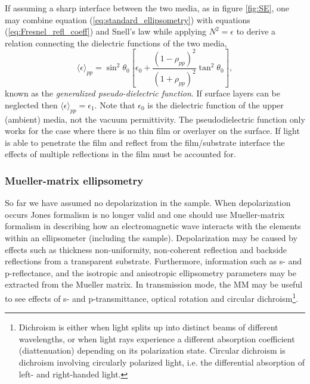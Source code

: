 If assuming a sharp interface between the two media, as in figure \ref{fig:SE}, one may combine equation (\ref{eq:standard_ellipsometry}) with equations (\ref{eq:Fresnel_refl_coeff}) and Snell's law while applying $N^2=\epsilon$ to derive a relation connecting the dielectric functions of the two media,
\begin{equation}
    \langle\epsilon\rangle_{pp} =  \sin^2\theta_0\left[ \epsilon_0 + \frac{(1-\rho_{pp})^2}{(1+\rho_{pp})^2}\tan^2\theta_0 \right],
    \label{eq:generalized_pseudo_dielectricfunction}
\end{equation}
known as the \emph{generalized pseudo-dielectric function}\cite{hans_arwin_reviewarticle}. If surface layers can be neglected then $\langle\epsilon\rangle_{pp}=\epsilon_1$. Note that $\epsilon_0$ is the dielectric function of the upper (ambient) media, not the vacuum permittivity. The pseudodielectric function only works for the case where there is no thin film or overlayer on the surface. If light is able to penetrate the film and reflect from the film/substrate interface the effects
of multiple reflections in the film must be accounted for.

\subsubsection{Mueller-matrix ellipsometry}
\label{sec:MM_ellipsometry}
So far we have assumed no depolarization in the sample. When depolarization occurs Jones formalism is no longer valid and one should use Mueller-matrix formalism in describing how an electromagnetic wave interacts with the elements within an ellipsometer (including the sample). Depolarization may be caused by effects such as thickness non-uniformity, non-coherent reflection and backside reflections from a transparent substrate. Furthermore, information such as s- and p-reflectance, and the isotropic and anisotropic ellipsometry parameters may be extracted from the Mueller matrix. In transmission mode, the MM may be useful to see effects of s- and p-transmittance, optical rotation and circular dichroism\footnote{Dichroism is either when light splits up into distinct beams of different wavelengths, or when light rays experience a different absorption coefficient (diattenuation) depending on its polarization state. Circular dichroism is dichroism involving circularly polarized light, i.e. the differential absorption of left- and right-handed light.}.

